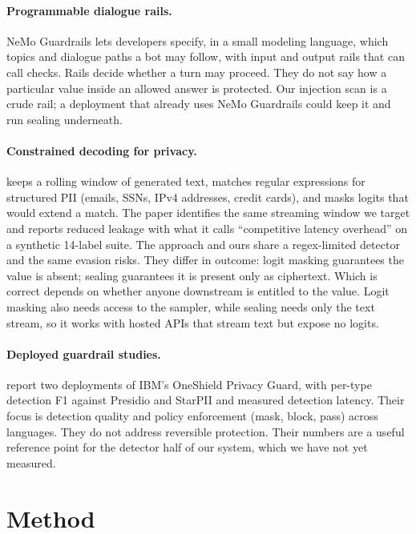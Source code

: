 \documentclass[11pt]{article}
\begin{document}
\paragraph{Programmable dialogue rails.} NeMo Guardrails \citep{rebedea2023nemo} lets developers specify, in a small modeling language, which topics and dialogue paths a bot may follow, with input and output rails that can call checks. Rails decide whether a turn may proceed. They do not say how a particular value inside an allowed answer is protected. Our injection scan is a crude rail; a deployment that already uses NeMo Guardrails could keep it and run sealing underneath.

\paragraph{Constrained decoding for privacy.} \citet{ram2025constrained} keeps a rolling window of generated text, matches regular expressions for structured PII (emails, SSNs, IPv4 addresses, credit cards), and masks logits that would extend a match. The paper identifies the same streaming window we target and reports reduced leakage with what it calls ``competitive latency overhead'' on a synthetic 14-label suite. The approach and ours share a regex-limited detector and the same evasion risks. They differ in outcome: logit masking guarantees the value is absent; sealing guarantees it is present only as ciphertext. Which is correct depends on whether anyone downstream is entitled to the value. Logit masking also needs access to the sampler, while sealing needs only the text stream, so it works with hosted APIs that stream text but expose no logits.

\paragraph{Deployed guardrail studies.} \citet{asthana2025deploying} report two deployments of IBM's OneShield Privacy Guard, with per-type detection F1 against Presidio and StarPII and measured detection latency. Their focus is detection quality and policy enforcement (mask, block, pass) across languages. They do not address reversible protection. Their numbers are a useful reference point for the detector half of our system, which we have not yet measured.

\section{Method}
\label{sec:method}
\end{document}
